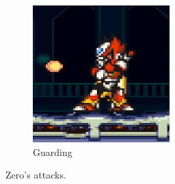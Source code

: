 \begin{figure}[htp]
\begin{subfigure}{0.3\linewidth}
		\includegraphics[width=\linewidth]{figures/X2/Hunter_stages/Zero_guard.png}
		\caption{Guarding}
	\end{subfigure}	
	\caption{Zero's attacks.}	
\end{figure}

